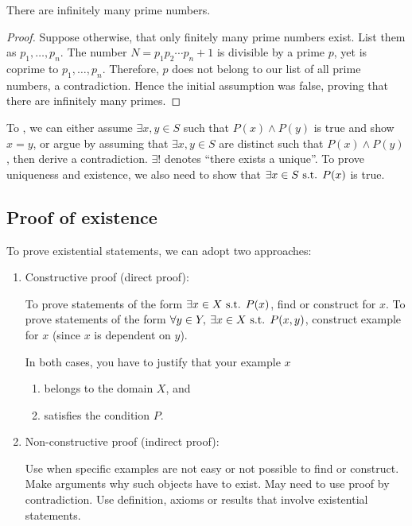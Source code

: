 \begin{exercise}
There are infinitely many prime numbers.
\end{exercise}

\begin{proof}
Suppose otherwise, that only finitely many prime numbers exist. List them as $p_1,\dots,p_n$. The number $N=p_1p_2\cdots p_n+1$ is divisible by a prime $p$, yet is coprime to $p_1,\dots,p_n$. Therefore, $p$ does not belong to our list of all prime numbers, a contradiction. Hence the initial assumption was false, proving that there are infinitely many primes.
\end{proof}

To , we can either assume $\exists x,y \in S$ such that $P(x) \land P(y)$ is true and show $x=y$, or argue by assuming that $\exists x,y \in S$ are distinct such that $P(x) \land P(y)$, then derive a contradiction. $\exists!$ denotes ``there exists a unique''. To prove uniqueness and existence, we also need to show that $\exists x \in S \text{ s.t. } P(x)$ is true.

\subsection{Proof of existence}
To prove existential statements, we can adopt two approaches:
\begin{enumerate}
\item Constructive proof (direct proof): 

To prove statements of the form $\exists x\in X \text{ s.t. } P(x)$, find or construct  for $x$. To prove statements of the form $\forall y\in Y,\:\exists x\in X\text{ s.t. } P(x,y)$, construct example for $x$  (since $x$ is dependent on $y$).

In both cases, you have to justify that your example $x$
\begin{enumerate}
\item belongs to the domain $X$, and
\item satisfies the condition $P$.
\end{enumerate}

\item Non-constructive proof (indirect proof): 

Use when specific examples are not easy or not possible to find or construct.
Make arguments why such objects have to exist.
May need to use proof by contradiction.
Use definition, axioms or results that involve existential statements.
\end{enumerate}

